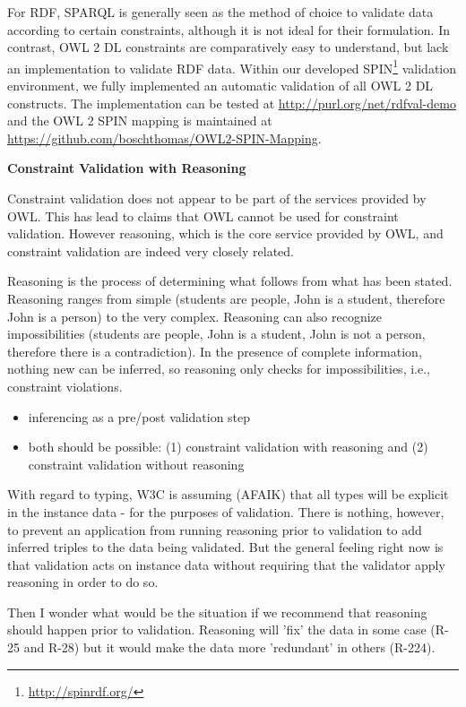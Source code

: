 \documentclass{llncs}
\newcommand{\tb}[1]{\todo[size=\small, color=green!40]{\textbf{Thomas:} #1}}
\begin{document}
For RDF, SPARQL is generally seen as the method of choice to validate data according to certain constraints, although it is not ideal for their formulation. 
In contrast, OWL 2 DL constraints are comparatively easy to understand, but lack an implementation to validate RDF data.
Within our developed SPIN\footnote{\url{http://spinrdf.org/}} validation environment, we fully implemented an automatic validation of all OWL 2 DL constructs. 
The implementation can be tested at \url{http://purl.org/net/rdfval-demo} and
the OWL 2 SPIN mapping is maintained at \url{https://github.com/boschthomas/OWL2-SPIN-Mapping}.

\tb{ToDo Thomas: constraint languages}

\textbf{Constraint Validation with Reasoning}

Constraint validation does not appear to be part of the services provided by
OWL.  This has lead to claims that OWL cannot be used for constraint
validation.  However reasoning, which is the core service provided by OWL,
and constraint validation are indeed very closely related.

Reasoning is the process of determining what follows from what has been
stated.  Reasoning ranges from simple (students are people, John is a
student, therefore John is a person) to the very complex. Reasoning can
also recognize impossibilities (students are people, John is a student, John
is not a person, therefore there is a contradiction).  In the presence of
complete information, nothing new can be inferred, so reasoning only checks
for impossibilities, i.e., constraint violations.  

\begin{itemize}
	\item inferencing as a pre/post validation step
	\item both should be possible: (1) constraint validation with reasoning and (2) constraint validation without reasoning 
\end{itemize}

With regard to typing, W3C is assuming (AFAIK) that all types will be
explicit in the instance data - for the purposes of validation. There is
nothing, however, to prevent an application from running reasoning prior
to validation to add inferred triples to the data being validated. But
the general feeling right now is that validation acts on instance data
without requiring that the validator apply reasoning in order to do so.

Then I wonder what would be the situation if we recommend that reasoning should happen prior to validation. Reasoning will 'fix' the data in some case (R-25 and R-28) but it would make the data more 'redundant' in others (R-224).
\end{document}
